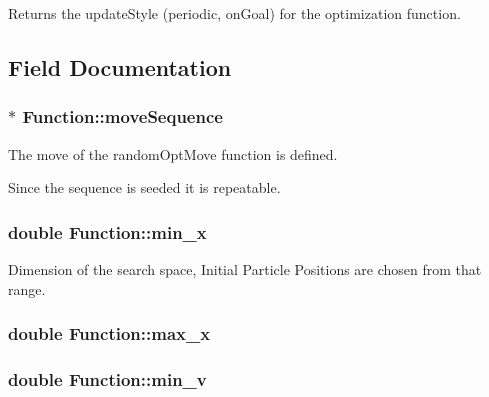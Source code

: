 Returns the updateStyle (periodic, onGoal) for the optimization function. 



\subsection{Field Documentation}
\hypertarget{classFunction_145da37ba2e1e9db056f7227328ee37f}{
\subsubsection{$\ast$ {\bf Function::moveSequence}}}
\label{classFunction_145da37ba2e1e9db056f7227328ee37f}


The move of the randomOptMove function is defined. 

Since the sequence is seeded it is repeatable. \hypertarget{classFunction_944697d89610cf8194f1abc9d559b572}{
\subsubsection{\setlength{\rightskip}{0pt plus 5cm}double {\bf Function::min\_\-x}}}
\label{classFunction_944697d89610cf8194f1abc9d559b572}


Dimension of the search space, Initial Particle Positions are chosen from that range. 

\hypertarget{classFunction_aa409aec3c3c38af95f5c547bfc3d18c}{
\subsubsection{\setlength{\rightskip}{0pt plus 5cm}double {\bf Function::max\_\-x}}}
\label{classFunction_aa409aec3c3c38af95f5c547bfc3d18c}


\hypertarget{classFunction_4c842a8625fcb505a1bfcf17e28f4b7f}{
\subsubsection{\setlength{\rightskip}{0pt plus 5cm}double {\bf Function::min\_\-v}}}
\label{classFunction_4c842a8625fcb505a1bfcf17e28f4b7f}


